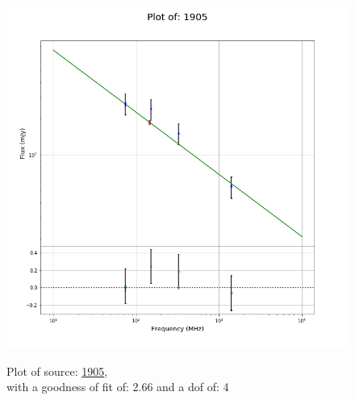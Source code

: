 \documentclass{article}
\begin{document}
\begin{figure}[H]
\begin{minipage}{0.5\textwidth}
        \includegraphics[scale = 0.35]{KmeulenTrap4P23_1hr/1hr1905.png}
        \captionsetup{labelformat=empty}
        \caption{Plot of source: \href{http://banana.transientskp.org/r4/vlo_KmeulenTrap4P23/runningcatalog/1905}{1905},\\with a goodness of fit of: 2.66 and a dof of: 4}
    \addtocounter{figure}{-1}
    \label{KmeulenTrap4P23:1hr:1905:plot}
    \end{minipage}
\end{figure}
\end{document}

